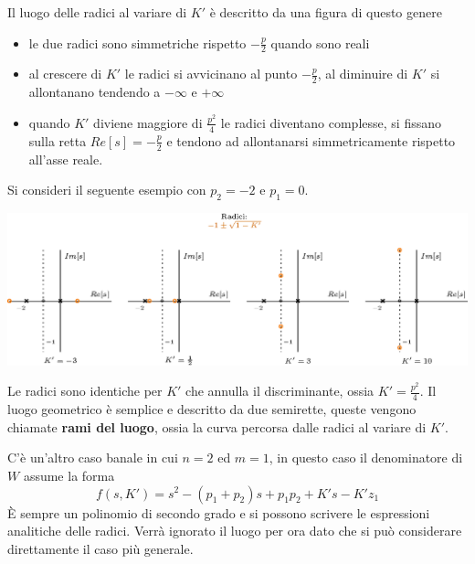 \documentclass[10pt, letterpaper]{report}
\begin{document}
Il luogo delle radici al variare di $K'$ è descritto da una figura di questo genere\begin{itemize}
    \item  le due radici sono simmetriche rispetto $-\frac{p}{2}$ quando sono reali 
    \item al crescere di $K'$ le radici si avvicinano al punto $-\frac{p}{2}$, al diminuire di $K'$ si allontanano tendendo a $-\infty$ e $+\infty$ 
    \item quando $K'$ diviene maggiore di $\frac{p^2}{4}$ le radici diventano complesse, si fissano sulla retta $Re[s]=-\frac{p}{2}$ e tendono ad allontanarsi simmetricamente rispetto all'asse reale.
\end{itemize}
Si consideri il seguente esempio con $p_2=-2$ e $p_1=0$.
\begin{center}
    \includegraphics[width=1\textwidth ]{images/esempioLuogoRadici.eps}
\end{center}
Le radici sono identiche per $K'$ che annulla il discriminante, ossia $K'=\frac{p^2}{4}$. Il luogo geometrico è semplice e descritto da due semirette, queste vengono chiamate \textbf{rami del luogo}, ossia la curva percorsa dalle radici al variare di $K'$.\bigskip 

C'è un'altro caso banale in cui $n=2$ ed $m=1$, in questo caso il denominatore di $W$ assume la forma 
$$ f(s,K')=s^2-(p_1+p_2)s+p_1p_2+K's-K'z_1$$
È sempre un polinomio di secondo grado e si possono scrivere le espressioni analitiche delle radici. Verrà ignorato il luogo per ora dato che si può considerare direttamente il caso più generale.
\end{document}
